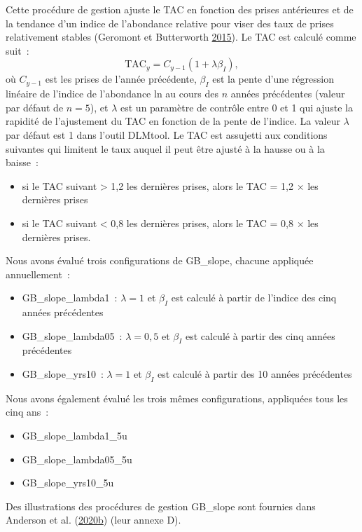 \documentclass[french,11pt]{book}
\begin{document}
Cette procédure de gestion ajuste le TAC en fonction des prises antérieures et de la tendance d'un indice de l'abondance relative pour viser des taux de prises relativement stables (Geromont et Butterworth \protect\hyperlink{ref-geromont2015}{2015}). Le TAC est calculé comme suit~:
\begin{equation}
\textrm{TAC}_y= C_{y-1}(1+\lambda \beta_I),
\end{equation}
où \(C_{y-1}\) est les prises de l'année précédente, \(\beta_I\) est la pente d'une régression linéaire de l'indice de l'abondance ln au cours des \(n\) années précédentes (valeur par défaut de \(n = 5\)), et \(\lambda\) est un paramètre de contrôle entre 0 et 1 qui ajuste la rapidité de l'ajustement du TAC en fonction de la pente de l'indice. La valeur \(\lambda\) par défaut est 1 dans l'outil DLMtool. Le TAC est assujetti aux conditions suivantes qui limitent le taux auquel il peut être ajusté à la hausse ou à la baisse~:
\begin{itemize}

\item
  si le TAC suivant \textgreater{} 1,2 les dernières prises, alors le TAC = 1,2 \(\times\) les dernières prises
\item
  si le TAC suivant \textless{} 0,8 les dernières prises, alors le TAC = 0,8 \(\times\) les dernières prises.
\end{itemize}
Nous avons évalué trois configurations de GB\_slope, chacune appliquée annuellement~:
\begin{itemize}
\item
  GB\_slope\_lambda1~: \(\lambda = 1\) et \(\beta_I\) est calculé à partir de l'indice des cinq années précédentes
\item
  GB\_slope\_lambda05~: \(\lambda = 0,5\) et \(\beta_I\) est calculé à partir des cinq années précédentes
\item
  GB\_slope\_yrs10~: \(\lambda = 1\) et \(\beta_I\) est calculé à partir des 10 années précédentes
\end{itemize}
Nous avons également évalué les trois mêmes configurations, appliquées tous les cinq ans~:
\begin{itemize}
\item
  GB\_slope\_lambda1\_5u
\item
  GB\_slope\_lambda05\_5u
\item
  GB\_slope\_yrs10\_5u
\end{itemize}
Des illustrations des procédures de gestion GB\_slope sont fournies dans Anderson et al. (\protect\hyperlink{ref-anderson2020gfmp}{2020}\protect\hyperlink{ref-anderson2020gfmp}{b}) (leur annexe D).
\end{document}
